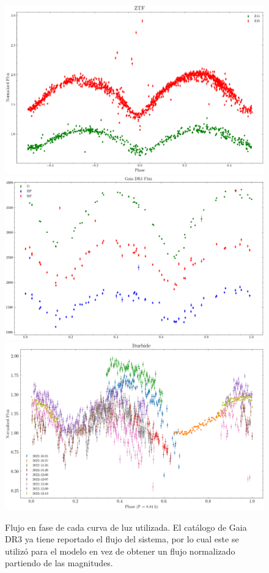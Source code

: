 \begin{figure}[!ht]
	\centering
	\includegraphics[scale=0.3]{Metodologia/Secciones/NormalizacionFlujos/Figures/ZTF Normalized Flux.png}
	\includegraphics[scale=0.3]{Metodologia/Secciones/NormalizacionFlujos/Figures/GDR3 Flux.png}
	\includegraphics[scale=0.4]{Metodologia/Secciones/NormalizacionFlujos/Figures/Iturbide Normalized Flux.png}

	\caption{Flujo en fase de cada curva de luz utilizada. El catálogo de Gaia
		DR3 ya tiene reportado el flujo del sistema, por lo cual este se utilizó
		para el modelo en vez de obtener un flujo normalizado partiendo de las
		magnitudes.}
	\label{normFlujosCurvas}
\end{figure}